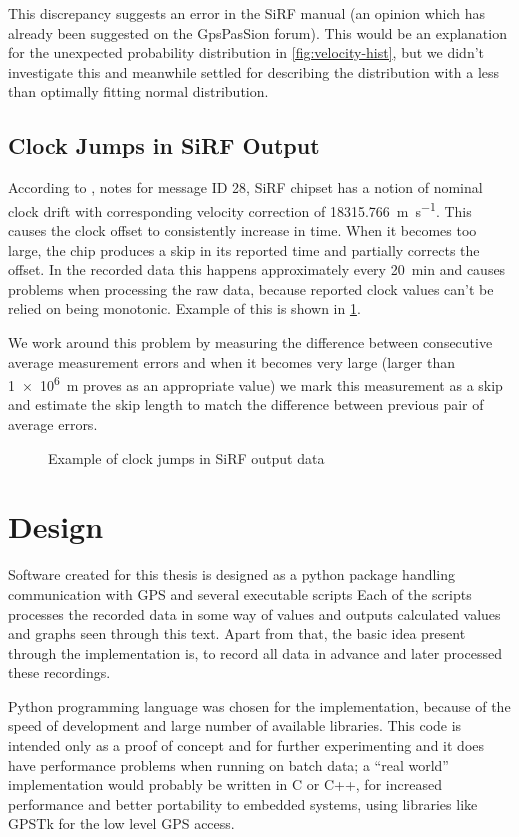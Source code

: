 This discrepancy suggests an error in the SiRF manual (an opinion which has already been
suggested on the GpsPasSion forum).
This would be an explanation for the unexpected probability distribution in
\cref{fig:velocity-hist}, but we didn't investigate this and meanwhile
settled for describing the distribution with a less than optimally fitting normal distribution.

\subsection{Clock Jumps in SiRF Output}
\label{sec:impl-sirf-jumps}
According to \cite{sirf-protocol}, notes for message ID 28, SiRF chipset has a
notion of nominal clock drift with corresponding velocity correction of \SI{18315.766}{\meter\per\second}.
This causes the clock offset to consistently increase in time.
When it becomes too large, the chip produces a skip in its reported time and
partially corrects the offset.
In the recorded data this happens approximately every \SI{20}{\minute} and causes
problems when processing the raw data, because reported clock values
can't be relied on being monotonic.
Example of this is shown in \cref{fig:impl-clock-jumps}.

We work around this problem by measuring the difference between consecutive average
measurement errors and when it becomes very large (larger than \SI{1e6}{\meter} proves as an
appropriate value) we mark this measurement as a skip and estimate the skip
length to match the difference between previous pair of average errors.

\begin{figure}[tp]
	\centering
	\caption{Example of clock jumps in SiRF output data}
	\label{fig:impl-clock-jumps}
\end{figure}

\section{Design}
Software created for this thesis is designed as a python package handling communication
with GPS and several executable scripts
Each of the scripts processes the recorded data in some way of values and
outputs calculated values and graphs seen through this text.
Apart from that, the basic idea present through the implementation is, to record
all data in advance and later processed these recordings.

Python programming language was chosen for the implementation,
because of the speed of development and large number of available libraries.
This code is intended only as a proof of
concept and for further experimenting and it does have performance problems
when running on batch data; a \enquote{real world} implementation
would probably be written in C or C++, for increased performance and better portability
to embedded systems, using libraries like GPSTk \cite{tolman04} for the low level GPS access.

